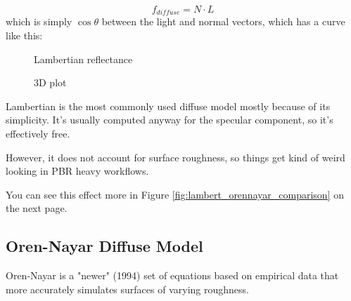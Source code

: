 \documentclass[12pt,letterpaper]{article}
\begin{document}
$$
f_{diffuse} = N \cdot L
$$
which is simply $\cos\theta$ between the light and normal vectors, which has a curve like this:
\begin{figure}[htbp]
  \begin{minipage}[b]{0.5\linewidth}
    \centering
    \pgfplotsset{width=15em}
    \caption{Lambertian reflectance}
  \end{minipage}
  \hspace{-16pt}
  \begin{minipage}[b]{0.5\linewidth}
    \centering
	\pgfplotsset{width=20em}
    \caption{3D plot}
  \end{minipage}
\end{figure}

Lambertian is the most commonly used diffuse model mostly because of its simplicity. 
It's usually computed anyway for the specular component, so it's effectively free.

However, it does not account for surface roughness, so things get kind of weird looking in PBR heavy workflows.

You can see this effect more in Figure {\color{blue}\ref{fig:lambert_orennayar_comparison}} on the next page.

\newpage

\subsection{Oren-Nayar Diffuse Model}

Oren-Nayar is a "newer" (1994) set of equations based on empirical data that more accurately simulates surfaces of varying roughness.
\end{document}
